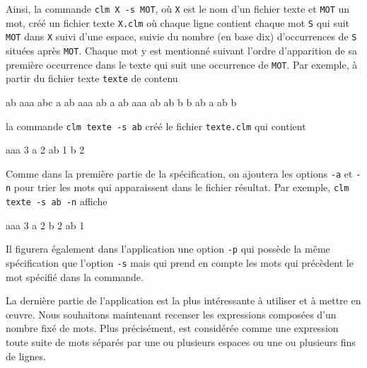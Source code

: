 \documentclass[11pt]{article}
\theoremstyle{definition}
\begin{document}
Ainsi, la commande {\tt clm X -s MOT}, où {\tt X} est le nom d'un fichier
texte et {\tt MOT} un mot, créé un fichier texte {\tt X.clm} où chaque
ligne contient chaque mot {\tt S} qui suit {\tt MOT} dans {\tt X} suivi
d'une espace, suivie du nombre (en base dix) d'occurrences de {\tt S}
situées après {\tt MOT}. Chaque mot y est mentionné suivant l'ordre
d'apparition de sa première occurrence dans le texte qui suit une
occurrence de {\tt MOT}. Par exemple, à partir du fichier texte
{\tt texte} de contenu
\begin{center} \footnotesize
\begin{boxedverbatim}
ab aaa abc a ab
aaa ab a ab aaa
ab ab b b ab a ab b
\end{boxedverbatim}
\end{center}
la commande {\tt clm texte -s ab} créé le fichier {\tt texte.clm} qui
contient
\begin{center} \footnotesize
\begin{boxedverbatim}
aaa 3
a 2
ab 1
b 2
\end{boxedverbatim}
\end{center}
Comme dans la première partie de la spécification, on ajoutera les options
{\tt -a} et {\tt -n} pour trier les mots qui apparaissent dans le
fichier résultat. Par exemple, {\tt clm texte -s ab -n} affiche
\begin{center} \footnotesize
\begin{boxedverbatim}
aaa 3
a 2
b 2
ab 1
\end{boxedverbatim}
\end{center}

Il figurera également dans l'application une option {\tt -p} qui possède
la même spécification que l'option {\tt -s} mais qui prend en compte
les mots qui précèdent le mot spécifié dans la commande.
\medskip

La dernière partie de l'application est la plus intéressante à utiliser
et à mettre en \oe uvre. Nous souhaitons maintenant recenser les
expressions composées d'un nombre fixé de mots. Plus précisément, est
considérée comme une expression toute suite de mots séparés par une ou
plusieurs espaces ou une ou plusieurs fins de lignes.
\medskip
\end{document}
